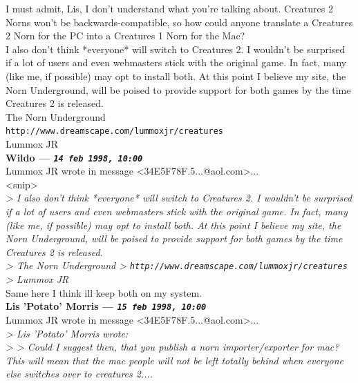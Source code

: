\documentclass[11pt,twoside,a4paper]{article}
\begin{document}
\begin{multicols*}{2}
I must admit, Lis, I don't understand what you're talking about. Creatures 2 Norns won't be backwards-compatible, so how could anyone translate a Creatures 2 Norn for the PC into a Creatures 1 Norn for the Mac?~\\

I also don't think *everyone* will switch to Creatures 2. I wouldn't be surprised if a lot of users and even webmasters stick with the original game. In fact, many (like me, if possible) may opt to install both. At this point I believe my site, the Norn Underground, will be poised to provide support for both games by the time Creatures 2 is released.~\\

The Norn Underground~\\
\texttt{http://www.dreamscape.com/lummoxjr/creatures}~\\
Lummox JR~\\

 
		
	
		
\textbf{Wildo --- \emph{\texttt{14 feb 1998, 10:00}}}~\\

Lummox JR wrote in message <34E5F78F.5...@aol.com>...~\\
<snip>~\\
\emph{> I also don't think *everyone* will switch to Creatures 2. I wouldn't be surprised if a lot of users and even webmasters stick with the original game. In fact, many (like me, if possible) may opt to install both. At this point I believe my site, the Norn Underground, will be poised to provide support for both games by the time Creatures 2 is released.}~\\

\emph{> The Norn Underground}
\emph{> \texttt{http://www.dreamscape.com/lummoxjr/creatures}}~\\
\emph{> Lummox JR}~\\

Same here I think ill keep both on my system.~\\

 
		
	
		
\textbf{Lis 'Potato' Morris --- \emph{\texttt{15 feb 1998, 10:00}}}~\\

Lummox JR wrote in message <34E5F78F.5...@aol.com>...~\\
\emph{> Lis 'Potato' Morris wrote:}~\\
\emph{> >  Could I suggest then, that you publish a norn importer/exporter for mac? This will mean that the mac people will not be left totally behind when everyone else switches over to creatures 2....}~\\


\end{multicols*}
\end{document}
